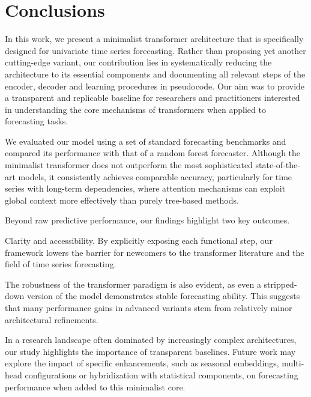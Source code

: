 \documentclass[algorithms,article,submit,pdftex,moreauthors]{Definitions/mdpi}
\begin{document}
\section{Conclusions} \label{sec:conclusions}

In this work, we present a minimalist transformer architecture that is specifically designed for univariate time series forecasting. Rather than proposing yet another cutting-edge variant, our contribution lies in systematically reducing the architecture to its essential components and documenting all relevant steps of the encoder, decoder and learning procedures in pseudocode. Our aim was to provide a transparent and replicable baseline for researchers and practitioners interested in understanding the core mechanisms of transformers when applied to forecasting tasks.

We evaluated our model using a set of standard forecasting benchmarks and compared its performance with that of a random forest forecaster. Although the minimalist transformer does not outperform the most sophisticated state-of-the-art models, it consistently achieves comparable accuracy, particularly for time series with long-term dependencies, where attention mechanisms can exploit global context more effectively than purely tree-based methods.

Beyond raw predictive performance, our findings highlight two key outcomes.

Clarity and accessibility. By explicitly exposing each functional step, our framework lowers the barrier for newcomers to the transformer literature and the field of time series forecasting.

The robustness of the transformer paradigm is also evident, as even a stripped-down version of the model demonstrates stable forecasting ability. This suggests that many performance gains in advanced variants stem from relatively minor architectural refinements.

In a research landscape often dominated by increasingly complex architectures, our study highlights the importance of transparent baselines. Future work may explore the impact of specific enhancements, such as seasonal embeddings, multi-head configurations or hybridization with statistical components, on forecasting performance when added to this minimalist core.

\appendixstart
\appendix
\end{document}
